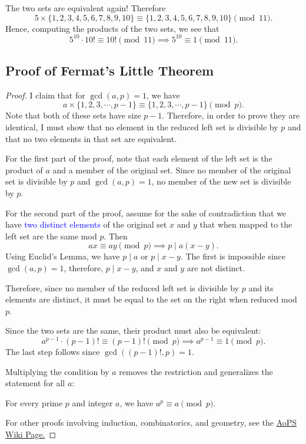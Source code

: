 \clearpage

The two sets are equivalent again! Therefore $$5\times \{1,2,3,4,5,6,7,8,9,10\}\equiv \{1,2,3,4,5,6,7,8,9,10\}\pmod{11}.$$ Hence, computing the products of the two sets, we see that $$5^{10}\cdot 10!\equiv 10!\pmod{11}\implies 5^{10}\equiv 1\pmod{11}.$$ 


\subsection{Proof of Fermat's Little Theorem}
\begin{proof} I claim that for $\gcd(a,p)=1$, we have $$a\times \{1, 2, 3, \cdots, p-1\}\equiv \{1, 2, 3, \cdots, p-1\}\pmod{p}.$$ Note that both of these sets have size $p-1$. Therefore, in order to prove they are identical, I must show that no element in the reduced left set is divisible by $p$ and that no two elements in that set are equivalent. 
	
For the first part of the proof, note that each element of the left set is the product of $a$ and a member of the original set. Since no member of the original set is divisible by $p$ and $\gcd(a,p)=1$, no member of the new set is divisible by $p$.

For the second part of the proof, assume for the sake of contradiction that we have \textcolor{blue}{two distinct elements} of the original set $x$ and $y$ that when mapped to the left set are the same mod $p$. Then $$ax\equiv ay\pmod{p}\implies p\mid a(x-y).$$ Using Euclid's Lemma, we have $p\mid a$ or $p\mid x-y$. The first is impossible since $\gcd(a,p)=1$, therefore, $p\mid x-y$, and $x$ and $y$ are not distinct.

Therefore, since no member of the reduced left set is divisible by $p$ and its elements are distinct, it must be equal to the set on the right when reduced mod $p$. 
\clearpage

Since the two sets are the same, their product must also be equivalent: $$a^{p-1}\cdot (p-1)!\equiv (p-1)!\pmod{p}\implies a^{p-1}\equiv 1\pmod{p}.$$ The last step follows since $\gcd\left((p-1)!, p\right)=1$.

Multiplying the condition by $a$ removes the restriction and generalizes the statement for all $a$: \begin{theorem}[Fermat] For every prime $p$ and integer $a$, we have $a^{p}\equiv a\pmod{p}$. \end{theorem} For other proofs involving induction, combinatorics, and geometry, see the \href{http://artofproblemsolving.com/wiki/index.php/Fermat\%27s_Little_Theorem}{AoPS Wiki Page.}

\end{proof}

